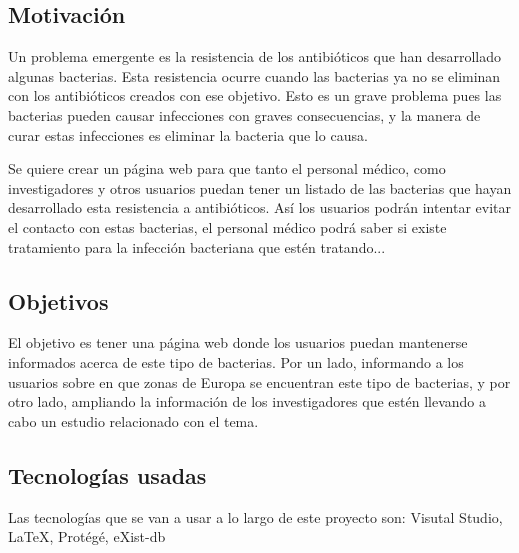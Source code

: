\documentclass[../main.tex]{subfiles}
\begin{document}
\subsection{Motivación}

Un problema emergente es la resistencia de los antibióticos que han desarrollado algunas bacterias. Esta resistencia ocurre cuando las bacterias ya no se eliminan con los antibióticos creados con ese objetivo. Esto es un grave problema pues las bacterias pueden causar infecciones con graves consecuencias, y la manera de curar estas infecciones es eliminar la bacteria que lo causa. 

Se quiere crear un página web para que tanto el personal médico, como investigadores y otros usuarios puedan tener un listado de las bacterias que hayan desarrollado esta resistencia a antibióticos. Así los usuarios podrán intentar evitar el contacto con estas bacterias, el personal médico podrá saber si existe tratamiento para la infección bacteriana que estén tratando...

\subsection{Objetivos}

El objetivo es tener una página web donde los usuarios puedan mantenerse informados acerca de este tipo de bacterias. Por un lado, informando a los usuarios sobre en que zonas de Europa se encuentran este tipo de bacterias, y por otro lado, ampliando la información de los investigadores que estén llevando a cabo un estudio relacionado con el tema.

\subsection{Tecnologías usadas}

Las tecnologías que se van a usar a lo largo de este proyecto son: Visutal Studio, \LaTeX, Protégé, eXist-db
\end{document}

